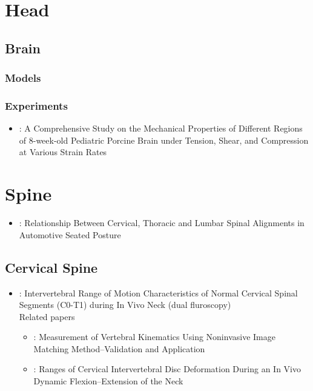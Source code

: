 \documentclass[]{book}
\providecommand{\tightlist}{%
  \setlength{\itemsep}{0pt}\setlength{\parskip}{0pt}}
\begin{document}
\hypertarget{head}{%
\chapter{Head}\label{head}}

\hypertarget{brain}{%
\section{Brain}\label{brain}}

\hypertarget{models}{%
\subsection{Models}\label{models}}

\hypertarget{experiments}{%
\subsection{Experiments}\label{experiments}}

\begin{itemize}
\tightlist
\item
  \citep{Li2019}: A Comprehensive Study on the Mechanical Properties of Different Regions of 8-week-old Pediatric Porcine Brain under Tension, Shear, and Compression at Various Strain Rates
\end{itemize}

\hypertarget{spine}{%
\chapter{Spine}\label{spine}}

\begin{itemize}
\tightlist
\item
  \citet{Sato2019}: Relationship Between Cervical, Thoracic and Lumbar Spinal Alignments in Automotive Seated Posture
\end{itemize}

\hypertarget{cervical-spine}{%
\section{Cervical Spine}\label{cervical-spine}}

\begin{itemize}
\tightlist
\item
  \citet{Zhou2019} : Intervertebral Range of Motion Characteristics of Normal Cervical Spinal Segments (C0-T1) during In Vivo Neck (dual fluroscopy)\\
  Related papers

  \begin{itemize}
  \tightlist
  \item
    \citet{Wang2008}: Measurement of Vertebral Kinematics Using Noninvasive Image Matching Method--Validation and Application
  \item
    \citet{Yu2017}: Ranges of Cervical Intervertebral Disc Deformation During an In Vivo Dynamic Flexion--Extension of the Neck
  \end{itemize}
\end{itemize}
\end{document}

